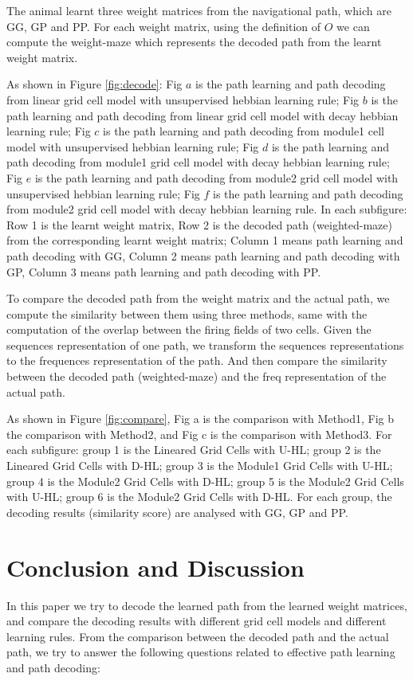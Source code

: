 \documentclass[11pt, letterpaper, onecolumn]{article}
\begin{document}
The animal learnt three weight matrices from the navigational path, which are GG, GP and PP. For each weight matrix, using the definition of $O$ we can compute the weight-maze which represents the decoded path from the learnt weight matrix.

As shown in Figure \ref{fig:decode}: Fig $a$ is the path learning and path decoding from linear grid cell model with unsupervised hebbian learning rule; Fig $b$ is the path learning and path decoding from linear grid cell model with decay hebbian learning rule; Fig $c$ is the path learning and path decoding from module1 cell model with unsupervised hebbian learning rule; Fig $d$ is the path learning and path decoding from module1 grid cell model with decay hebbian learning rule; Fig $e$ is the path learning and path decoding from module2 grid cell model with unsupervised hebbian learning rule; Fig $f$ is the path learning and path decoding from module2 grid cell model with decay hebbian learning rule. In each subfigure: Row 1 is the learnt weight matrix, Row 2 is the decoded path (weighted-maze) from the corresponding learnt weight matrix; Column 1 means path learning and path decoding with GG, Column 2  means path learning and path decoding with GP, Column 3  means path learning and path decoding with PP.

To compare the decoded path from the weight matrix and the actual path, we compute the similarity between them using three methods, same with the computation of the overlap between the firing fields of two cells. Given the sequences representation of one path, we transform the sequences representations to the frequences representation of the path. And then compare the similarity between the decoded path (weighted-maze) and the freq representation of the actual path.

As shown in Figure \ref{fig:compare}, Fig a is the comparison with Method1, Fig b the comparison with Method2, and Fig c is the comparison with Method3. For each subfigure: group 1 is the Lineared Grid Cells with U-HL; group 2 is the Lineared Grid Cells with D-HL; group 3 is the Module1  Grid Cells with U-HL; group 4 is the Module2 Grid Cells with D-HL; group 5 is the Module2 Grid Cells with U-HL; group 6 is the Module2 Grid Cells with D-HL. For each group, the decoding results (similarity score) are analysed with GG, GP and PP.


\section{Conclusion and Discussion}
In this paper we try to decode the learned path from the learned weight matrices, and compare the decoding results with different grid cell models and different learning rules. From the comparison between the decoded path and the actual path, we try to answer the following questions related to effective path learning and path decoding:
\end{document}
